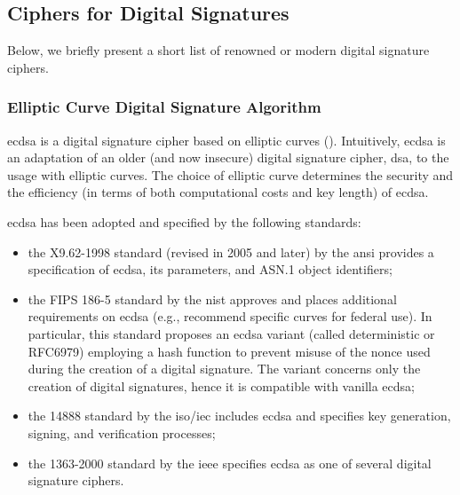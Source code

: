 \subsection{Ciphers for Digital Signatures}\label{sec:digital_signatures:ciphers}

Below, we briefly present a short list of renowned or modern digital signature ciphers.


\subsubsection{Elliptic Curve Digital Signature Algorithm}\label{sec:digital_signatures:ciphers:ecdsa}

\gls{ecdsa} is a digital signature cipher based on elliptic curves (). Intuitively, \gls{ecdsa} is an adaptation of an older (and now insecure) digital signature cipher, \gls{dsa}, to the usage with elliptic curves. The choice of elliptic curve determines the security and the efficiency (in terms of both computational costs and key length) of \gls{ecdsa}. 


\gls{ecdsa} has been adopted and specified by the following standards:
\begin{itemize}
	\item the X9.62-1998 standard \cite{ansi_ecdsa_1998} (revised in 2005 and later) by the \gls{ansi} provides a specification of \gls{ecdsa}, its parameters, and ASN.1 object identifiers;
	\item the FIPS 186-5 standard \cite{nist_ecdsa_2023} by the \gls{nist} approves and places additional requirements on \gls{ecdsa} (e.g., recommend specific curves for federal use). In particular, this standard proposes an \gls{ecdsa} variant (called deterministic or RFC6979) employing a hash function to prevent misuse of the nonce used during the creation of a digital signature. The variant concerns only the creation of digital signatures, hence it is compatible with vanilla \gls{ecdsa};
	\item the 14888 standard \cite{iso_ecdsa_2006} by the \gls{iso}/\gls{iec} includes \gls{ecdsa} and specifies key generation, signing, and verification processes;
	\item the 1363-2000 standard \cite{ieee_ecdsa_2000} by the \gls{ieee} specifies \gls{ecdsa} as one of several digital signature ciphers.
\end{itemize}


